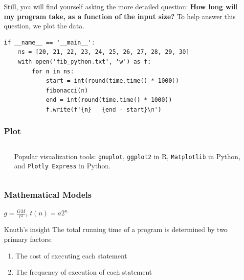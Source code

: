 \documentclass[aspectratio=169, 14pt]{beamer}
\begin{document}
\begin{frame}[fragile]

Still, you will find yourself asking the more detailed question: \textbf{How long will my program take, as a function of the input size?} To help answer this question, we plot the data. 

\begin{verbatim}
if __name__ == '__main__':
    ns = [20, 21, 22, 23, 24, 25, 26, 27, 28, 29, 30]
    with open('fib_python.txt', 'w') as f:
        for n in ns:
            start = int(round(time.time() * 1000))
            fibonacci(n)
            end = int(round(time.time() * 1000))
            f.write(f'{n}   {end - start}\n')
\end{verbatim}

\end{frame}

\begin{frame}
    \frametitle{Plot}
\begin{columns}
    \begin{center}
    \end{center}
    Popular visualization tools:  \texttt{gnuplot}, \texttt{ggplot2} in R, \texttt{Matplotlib} in Python, and \texttt{Plotly Express} in Python.

\end{columns}
\end{frame}

\begin{frame}
    \frametitle{Mathematical Models}
\(g = \frac{GM}{r^2}\), \(t(n) = a2^{n}\)

\begin{exampleblock}{Knuth's insight}
The total running time of a program is determined by two primary factors:
\begin{enumerate}
    \item The cost of executing each statement
    \item The frequency of execution of each statement
\end{enumerate}
\end{exampleblock}

\end{frame}
\end{document}
